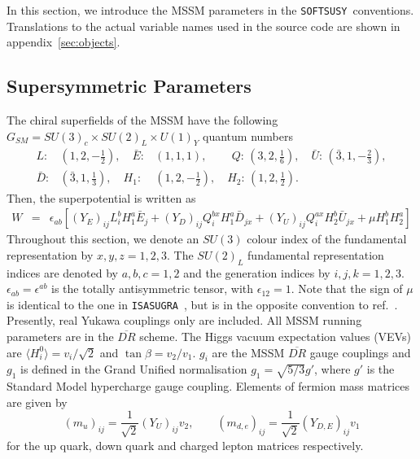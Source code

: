 \documentclass[]{article}
\def\SOFTSUSY{{\tt SOFTSUSY}}
\def\ISAJET{{\tt ISASUGRA}}
\def\half{\frac{1}{2}}
\begin{document}
In this section, we introduce the MSSM parameters in the
\SOFTSUSY~conventions. Translations to the actual variable names used in the
source code are shown in appendix~\ref{sec:objects}.

\subsection{Supersymmetric Parameters \label{susypars}}
The chiral superfields of the MSSM have the 
following $G_{SM}=SU(3)_c\times SU(2)_L\times U(1)_Y$ quantum numbers
\begin{eqnarray}
L:&(1,2,-\half),\quad {\bar E}:&(1,1,1),\qquad\, Q:\,(3,2,\frac{1}{6}),\quad
{\bar U}:\,({\bar 3},1,-\frac{2}{3}),\nonumber\\ {\bar D}:&({\bar 3},1,\frac{1}{3}),\quad
H_1:&(1,2,-\half),\quad  H_2:\,(1,2,\half).
\label{fields}
\end{eqnarray}
Then, the superpotential is written as
\begin{eqnarray}
W&=& \epsilon_{ab} \left[ (Y_E)_{ij} L_i^b
H_1^a {\bar E}_j + (Y_D)_{ij} Q_i^{bx} H_1^a {\bar D}_{jx} +
(Y_U)_{ij} Q_i^{ax} H_2^b {\bar U}_{jx}  + \mu  H_1^b H_2^a\right]
\label{superpot}
\end{eqnarray}
Throughout this section, we denote an $SU(3)$ colour index of the
fundamental representation by 
$x,y,z=1,2,3$. The $SU(2)_L$ fundamental representation indices are
denoted by $a,b,c=1,2$ and the generation indices by $i,j,k=1,2,3$.
$\epsilon_{ab}=\epsilon^{ab}$ is the totally antisymmetric tensor, with
$\epsilon_{12}=1$. 
Note that the sign of $\mu$ is identical to the one in 
\ISAJET~\cite{Baer:1999sp},
but is in the opposite convention to ref.~\cite{Pierce:1997zz}.
Presently, real Yukawa couplings only are included.
All MSSM running parameters are
in the $\overline{DR}$ scheme. The Higgs vacuum expectation values (VEVs) are
$\langle H_i^0 \rangle = v_i / \sqrt{2}$ and
$\tan\beta=v_2/v_1$. $g_i$ are the MSSM $\overline{DR}$ gauge couplings and 
$g_1$ is defined in the Grand Unified normalisation $g_1 = \sqrt{5/3} g'$,
where $g'$ is the Standard Model hypercharge gauge coupling.
Elements of fermion mass matrices are given by
\begin{equation} \label{yuksaway}
(m_u)_{ij} = \frac{1}{\sqrt{2}} (Y_U)_{ij} v_2, \qquad 
(m_{d,e})_{ij} = \frac{1}{\sqrt{2}} (Y_{D,E})_{ij} v_1
\end{equation}
for the up quark, down quark and charged lepton matrices respectively.
\end{document}
